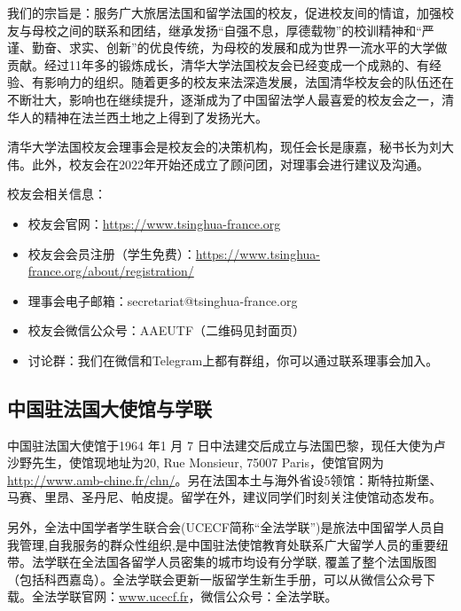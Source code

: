 我们的宗旨是：服务广大旅居法国和留学法国的校友，促进校友间的情谊，加强校友与母校之间的联系和团结，继承发扬“自强不息，厚德载物”的校训精神和“严谨、勤奋、求实、创新”的优良传统，为母校的发展和成为世界一流水平的大学做贡献。经过11年多的锻炼成长，清华大学法国校友会已经变成一个成熟的、有经验、有影响力的组织。随着更多的校友来法深造发展，法国清华校友会的队伍还在不断壮大，影响也在继续提升，逐渐成为了中国留法学人最喜爱的校友会之一，清华人的精神在法兰西土地之上得到了发扬光大。

清华大学法国校友会理事会是校友会的决策机构，现任会长是康嘉，秘书长为刘大伟。此外，校友会在2022年开始还成立了顾问团，对理事会进行建议及沟通。

校友会相关信息：
\begin{itemize}
    \item 校友会官网：\href{https://www.tsinghua-france.org}{https://www.tsinghua-france.org}
    \item 校友会会员注册（学生免费）：\href{https://www.tsinghua-france.org/about/registration/}{https://www.tsinghua-france.org/about/registration/}
    \item 理事会电子邮箱：secretariat@tsinghua-france.org 
    \item 校友会微信公众号：AAEUTF（二维码见封面页）
    \item 讨论群：我们在微信和Telegram上都有群组，你可以通过联系理事会加入。
\end{itemize}

\subsection{中国驻法国大使馆与学联}

中国驻法国大使馆于1964 年1 月 7 日中法建交后成立与法国巴黎，现任大使为卢沙野先生，使馆现地址为20, Rue Monsieur, 75007 Paris，使馆官网为\href{http://www.amb-chine.fr/chn/}{http://www.amb-chine.fr/chn/}。另在法国本土与海外省设5领馆：斯特拉斯堡、马赛、里昂、圣丹尼、帕皮提。留学在外，建议同学们时刻关注使馆动态发布。

另外，全法中国学者学生联合会(UCECF简称“全法学联”)是旅法中国留学人员自我管理,自我服务的群众性组织,是中国驻法使馆教育处联系广大留学人员的重要纽带。法学联在全法国各留学人员密集的城市均设有分学联, 覆盖了整个法国版图 （包括科西嘉岛）。全法学联会更新一版留学生新生手册，可以从微信公众号下载。全法学联官网：\href{www.ucecf.fr}{www.ucecf.fr}，微信公众号：全法学联。

